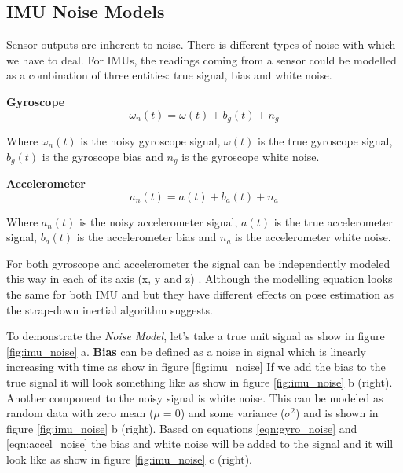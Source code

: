 \subsection{IMU Noise Models}
Sensor outputs are inherent to noise. There is different types of noise with which we have to deal. For IMUs, the readings coming from a sensor could be modelled as a combination of three entities: true signal, bias and white noise.

\textbf{Gyroscope}
\begin{equation}
    \omega_{n}(t) = \omega(t) + b_{g}(t) + n_{g}
\label{eqn:gyro_noise}
\end{equation}

Where $ \omega_{n}(t) $ is the noisy gyroscope signal, $ \omega(t) $ is the true gyroscope signal, $ b_{g}(t) $ is the gyroscope bias and $ n_{g} $ is the gyroscope white noise.

\textbf{Accelerometer}
\begin{equation}
    a_{n}(t) = a(t) + b_{a}(t) + n_{a}
\label{eqn:accel_noise}
\end{equation}

Where $ a_{n}(t) $ is the noisy accelerometer signal, $ a(t) $ is the true accelerometer signal, $ b_{a}(t) $ is the accelerometer bias and $ n_{a} $ is the accelerometer white noise.

For both gyroscope and accelerometer the signal can be independently modeled this way in each of its axis (x, y and z) \citep{imu_noise}. Although the modelling equation looks the same for both IMU and but they have different effects on pose estimation as the strap-down inertial algorithm suggests.

To demonstrate the \textit{Noise Model}, let's take a true unit signal as show in figure \ref{fig:imu_noise} a. \textbf{Bias} can be defined as a noise in signal which is linearly increasing with time as show in figure \ref{fig:imu_noise} 
If we add the bias to the true signal it will look something like as show in figure \ref{fig:imu_noise} b (right). Another component to the noisy signal is white noise. This can be modeled as random data with zero mean ($ \mu = 0 $) and some variance ($ \sigma^{2} $) and is shown in figure \ref{fig:imu_noise} b (right). Based on equations \ref{eqn:gyro_noise} and \ref{eqn:accel_noise} the bias and white noise will be added to the signal and it will look like as show in figure \ref{fig:imu_noise} c (right). 

